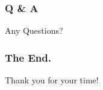 \documentclass{beamer}
\begin{document}
\begin{tframe} \frametitle{Q \& A}
	Any Questions?
\end{tframe}

\begin{tframe} \frametitle{The End.}
	Thank you for your time!
\end{tframe}
\end{document}
